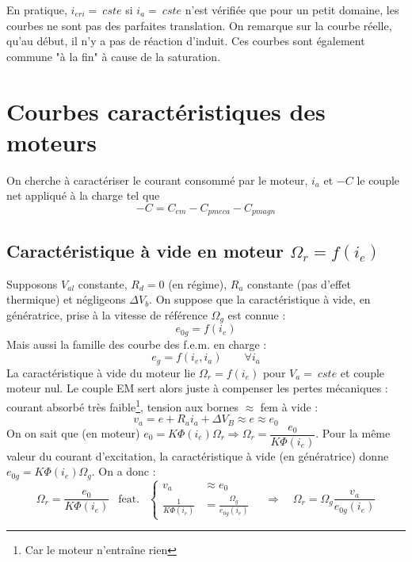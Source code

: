 		En pratique, $i_{eri} =\ cste$ si $i_a =\ cste$ n'est vérifiée que pour un 
		petit domaine, les courbes ne sont pas des parfaites translation. On remarque 
		sur la courbe réelle, qu'au début, il n'y a pas de réaction d'induit. Ces 
		courbes sont également commune "à la fin" à cause de la saturation.
		
		
\section{Courbes caractéristiques des moteurs}
On cherche à caractériser le courant consommé par le moteur, $i_a$ et $-C$ le couple 
net appliqué à la charge tel que
\begin{equation}
-C = C_{em} - C_{pmeca} - C_{pmagn}
\end{equation}
		
	\subsection{Caractéristique à vide en moteur $\Omega_r = f(i_e)$}
	Supposons $V_{al}$ constante, $R_d=0$ (en régime), $R_a$ constante (pas d'effet 
	thermique) et négligeons $\Delta V_b$. On suppose que la caractéristique à vide,
	en génératrice, 	prise à la vitesse de référence $\Omega_g$ est connue :
	\begin{equation}
	e_{0g} = f(i_e)
	\end{equation}
	Mais aussi la famille des courbe des f.e.m. en charge :
	\begin{equation}
	e_g = f(i_e,i_a)\qquad \forall i_a
	\end{equation}
	La caractéristique à vide du moteur lie $\Omega_r = f(i_e)$ pour $V_a=\ cste$ et 
	couple moteur nul. Le couple EM sert alors juste à compenser les pertes mécaniques : 
	courant absorbé très faible\footnote{Car le moteur n'entraîne rien}, tension aux 
	bornes $\approx$ fem à vide :
	\begin{equation}
	v_a = e+R_ai_a + \Delta V_B \approx e \approx e_0
	\end{equation}
	On on sait que (en moteur) $\displaystyle e_0 = K\Phi(i_e)\Omega_r \Longrightarrow 
	\Omega_r = 	\dfrac{e_0}{K\Phi(i_e)}$. Pour la même valeur du courant d’excitation, 
	la caractéristique à vide (en génératrice) donne $e_{0g} = K\Phi(i_e)\Omega_g$. On a donc :
	\begin{equation}
	\Omega_r = 	\dfrac{e_0}{K\Phi(i_e)}\ \ \text{ feat. }\ \ \left\{\begin{array}{ll}
	v_a &\approx e_0\\
	\frac{1}{K\Phi(i_e)} &= \frac{\Omega_g}{e_{0g}(i_e)}
	\end{array}\right.\quad  \Longrightarrow\quad \Omega_r = \Omega_g\dfrac{v_a}{e_{0g}(i_e)}
	\end{equation}\newpage
	
